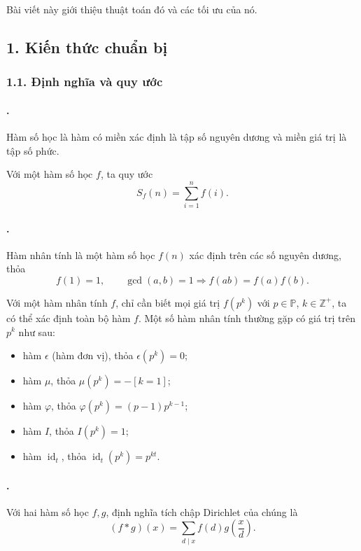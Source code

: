 \documentclass[11pt]{article}
\begin{document}
Bài viết này giới thiệu thuật toán đó và các tối ưu của nó.

\subsection*{1. Kiến thức chuẩn bị}

\subsubsection*{1.1. Định nghĩa và quy ước}

\paragraph{.}
Hàm số học là hàm có miền xác định là tập số nguyên dương và miền giá trị là
tập số phức.

Với một hàm số học \(f\), ta quy ước
\[
  S_f(n)=\sum_{i=1}^{n} f(i).
\]

\paragraph{.}
Hàm nhân tính là một hàm số học \(f(n)\) xác định trên các số nguyên dương,
thỏa
\[
  f(1)=1,\qquad
  \gcd(a,b)=1 \Longrightarrow f(ab)=f(a)f(b).
\]

Với một hàm nhân tính \(f\), chỉ cần biết mọi giá trị \(f(p^k)\) với
\(p\in\mathbb P\), \(k\in\mathbb Z^+\), ta có thể xác định toàn bộ hàm \(f\).
Một số hàm nhân tính thường gặp có giá trị trên \(p^k\) như sau:
\begin{itemize}
  \item hàm \(\epsilon\) (hàm đơn vị), thỏa \(\epsilon(p^k)=0\);
  \item hàm \(\mu\), thỏa \(\mu(p^k)=-[k=1]\);
  \item hàm \(\varphi\), thỏa \(\varphi(p^k)=(p-1)p^{k-1}\);
  \item hàm \(I\), thỏa \(I(p^k)=1\);
  \item hàm \(\operatorname{id}_t\), thỏa
  \(\operatorname{id}_t(p^k)=p^{kt}\).
\end{itemize}

\paragraph{.}
Với hai hàm số học \(f,g\), định nghĩa tích chập Dirichlet của chúng là
\[
  (f*g)(x)=\sum_{d\mid x} f(d)g\left(\frac{x}{d}\right).
\]
\end{document}

